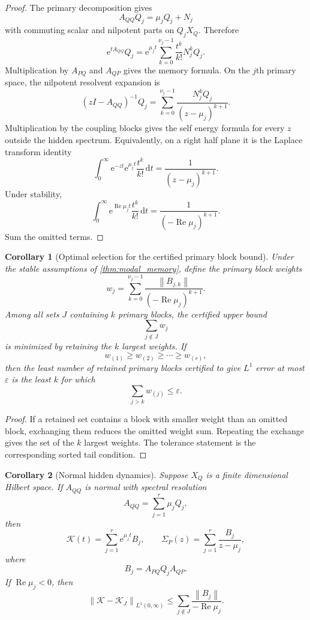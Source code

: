 \documentclass{aomart}
\newtheorem{corollary}[corollary]{Corollary}
\theoremstyle{definition}
\theoremstyle{remark}
\newcommand{\Kcal}{\mathcal K}
\newcommand{\e}{\mathrm e}
\newcommand{\dd}{\,\mathrm d}
\newcommand{\norm}[1]{\left\lVert#1\right\rVert}
\begin{document}
\begin{proof}
The primary decomposition gives
\[
A_{QQ}Q_j=\mu_jQ_j+N_j
\]
with commuting scalar and nilpotent parts on \(Q_jX_Q\). Therefore
\[
\e^{tA_{QQ}}Q_j
=
\e^{\mu_jt}
\sum_{k=0}^{\nu_j-1}
\frac{t^k}{k!}N_j^kQ_j.
\]
Multiplication by \(A_{PQ}\) and \(A_{QP}\) gives the memory formula. On the \(j\)th primary space, the nilpotent resolvent expansion is
\[
(zI-A_{QQ})^{-1}Q_j
=
\sum_{k=0}^{\nu_j-1}
\frac{N_j^kQ_j}{(z-\mu_j)^{k+1}}.
\]
Multiplication by the coupling blocks gives the self energy formula for every \(z\) outside the hidden spectrum. Equivalently, on a right half plane it is the Laplace transform identity
\[
\int_0^\infty
\e^{-zt}\e^{\mu_jt}
\frac{t^k}{k!}
\dd t
=
\frac{1}{(z-\mu_j)^{k+1}}.
\]
Under stability,
\[
\int_0^\infty
\e^{\operatorname{Re}\mu_jt}
\frac{t^k}{k!}
\dd t
=
\frac{1}{(-\operatorname{Re}\mu_j)^{k+1}}.
\]
Sum the omitted terms.
\end{proof}

\begin{corollary}[Optimal selection for the certified primary block bound]\label{cor:optimal_primary_selection}
Under the stable assumptions of \cref{thm:modal_memory}, define the primary block weights
\[
w_j
=
\sum_{k=0}^{\nu_j-1}
\frac{\norm{B_{j,k}}}
{(-\operatorname{Re}\mu_j)^{k+1}}.
\]
Among all sets \(J\) containing \(k\) primary blocks, the certified upper bound
\[
\sum_{j\notin J}w_j
\]
is minimized by retaining the \(k\) largest weights. If
\[
w_{(1)}\geq w_{(2)}\geq\cdots\geq w_{(r)},
\]
then the least number of retained primary blocks certified to give \(L^1\) error at most \(\varepsilon\) is the least \(k\) for which
\[
\sum_{j>k}w_{(j)}\leq\varepsilon.
\]
\end{corollary}

\begin{proof}
If a retained set contains a block with smaller weight than an omitted block, exchanging them reduces the omitted weight sum. Repeating the exchange gives the set of the \(k\) largest weights. The tolerance statement is the corresponding sorted tail condition.
\end{proof}

\begin{corollary}[Normal hidden dynamics]\label{cor:normal_modal_memory}
Suppose \(X_Q\) is a finite dimensional Hilbert space. If \(A_{QQ}\) is normal with spectral resolution
\[
A_{QQ}=\sum_{j=1}^r\mu_jQ_j,
\]
then
\[
\Kcal(t)=\sum_{j=1}^r\e^{\mu_jt}B_j,
\qquad
\Sigma_P(z)=\sum_{j=1}^r\frac{B_j}{z-\mu_j},
\]
where
\[
B_j=A_{PQ}Q_jA_{QP}.
\]
If \(\operatorname{Re}\mu_j<0\), then
\[
\norm{\Kcal-\Kcal_J}_{L^1(0,\infty)}
\leq
\sum_{j\notin J}
\frac{\norm{B_j}}{-\operatorname{Re}\mu_j}.
\]
\end{corollary}
\end{document}
